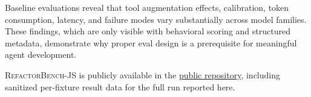 \documentclass[11pt,letterpaper]{article}
\begin{document}
Baseline evaluations reveal that tool augmentation effects, calibration, token consumption, latency, and failure modes vary substantially across model families. These findings, which are only visible with behavioral scoring and structured metadata, demonstrate why proper eval design is a prerequisite for meaningful agent development.

\textsc{RefactorBench}-JS is publicly available in the \href{https://github.com/Create-Inc/refactor-bench}{public repository}, including sanitized per-fixture result data for the full run reported here.



\end{document}
